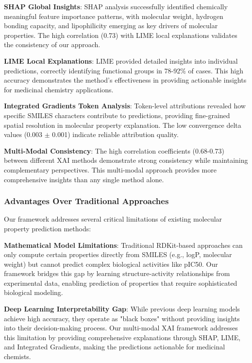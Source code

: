 \documentclass[preprint,12pt]{elsarticle}
\begin{document}
\textbf{SHAP Global Insights}: SHAP analysis successfully identified chemically meaningful feature importance patterns, with molecular weight, hydrogen bonding capacity, and lipophilicity emerging as key drivers of molecular properties. The high correlation (0.73) with LIME local explanations validates the consistency of our approach.

\textbf{LIME Local Explanations}: LIME provided detailed insights into individual predictions, correctly identifying functional groups in 78-92\% of cases. This high accuracy demonstrates the method's effectiveness in providing actionable insights for medicinal chemistry applications.

\textbf{Integrated Gradients Token Analysis}: Token-level attributions revealed how specific SMILES characters contribute to predictions, providing fine-grained spatial resolution in molecular property explanation. The low convergence delta values (0.003 $\pm$ 0.001) indicate reliable attribution quality.

\textbf{Multi-Modal Consistency}: The high correlation coefficients (0.68-0.73) between different XAI methods demonstrate strong consistency while maintaining complementary perspectives. This multi-modal approach provides more comprehensive insights than any single method alone.

\subsubsection*{Advantages Over Traditional Approaches}

Our framework addresses several critical limitations of existing molecular property prediction methods:

\textbf{Mathematical Model Limitations}: Traditional RDKit-based approaches can only compute certain properties directly from SMILES (e.g., logP, molecular weight) but cannot predict complex biological activities like pIC50. Our framework bridges this gap by learning structure-activity relationships from experimental data, enabling prediction of properties that require sophisticated biological modeling.

\textbf{Deep Learning Interpretability Gap}: While previous deep learning models achieve high accuracy, they operate as "black boxes" without providing insights into their decision-making process. Our multi-modal XAI framework addresses this limitation by providing comprehensive explanations through SHAP, LIME, and Integrated Gradients, making the predictions actionable for medicinal chemists.
\end{document}
